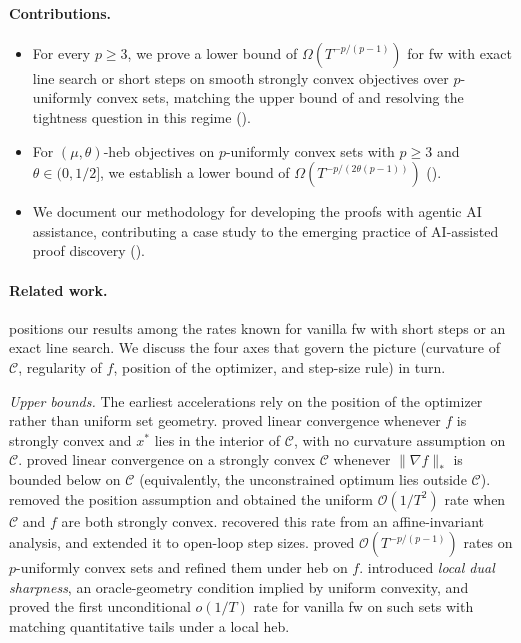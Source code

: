 \documentclass{article}
\newcommand{\C}{\mathcal{C}}
\newcommand{\norm}[1]{\|#1\|}
\newcommand{\bigo}[1]{\mathcal{O}( #1 )}
\newcommand{\bigomega}[1]{\Omega( #1 )}
\begin{document}
\paragraph{Contributions.}
\begin{itemize}
  \item For every $p\ge 3$, we prove a lower bound of $\bigomega{T^{-p/(p-1)}}$ for \gls{fw} with exact line search or short steps on smooth strongly convex objectives over $p$-uniformly convex sets, matching the upper bound of \citet{kerdreux2021projection,pokutta2026frankwolfe} and resolving the tightness question in this regime ().
  \item For $(\mu,\theta)$-\gls{heb} objectives on $p$-uniformly convex sets with $p\geq 3$ and $\theta \in (0, 1/2]$, we establish a lower bound of $\bigomega{T^{-p/(2\theta(p-1))}}$ ().
  \item We document our methodology for developing the proofs with agentic AI assistance, contributing a case study to the emerging practice of AI-assisted proof discovery ().
\end{itemize}

\paragraph{Related work.}
 positions our results among the rates known for vanilla \gls{fw} with short steps or an exact line search. We discuss the four axes that govern the picture (curvature of $\C $, regularity of $f$, position of the optimizer, and step-size rule) in turn.

\emph{Upper bounds.}
The earliest accelerations rely on the position of the optimizer rather than uniform set geometry.
\citet{wolfe1970convergence} proved linear convergence whenever $f$ is strongly convex and $x^*$ lies in the interior of $\C $, with no curvature assumption on $\C $.
\citet{levitin1966constrained} proved linear convergence on a strongly convex $\C $ whenever $\norm{\nabla f}_\ast$ is bounded below on $\C $ (equivalently, the unconstrained optimum lies outside $\C $).
\citet{garber15faster} removed the position assumption and obtained the uniform $\bigo{1/T^2}$ rate when $\C $ and $f$ are both strongly convex.
\citet{kerdreux21affine} recovered this rate from an affine-invariant analysis, and \citet{wirth23acceleration} extended it to open-loop step sizes.
\citet{kerdreux2021projection} proved $\bigo{T^{-p/(p-1)}}$ rates on $p$-uniformly convex sets and refined them under \gls{heb} on $f$.
\citet{pokutta2026frankwolfe} introduced \emph{local dual sharpness}, an oracle-geometry condition implied by uniform convexity, and proved the first unconditional $o(1/T)$ rate for vanilla \gls{fw} on such sets with matching quantitative tails under a local \gls{heb}.
\end{document}
